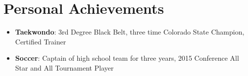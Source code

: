 \documentclass[10pt,letterpaper]{article}
\begin{document}
\section*{Personal Achievements}
\begin{itemize}
    \item \textbf{Taekwondo}: 3rd Degree Black Belt, three time Colorado State
        Champion, Certified Trainer
    \item \textbf{Soccer}: Captain of high school team for three years, 2015
        Conference All Star and All Tournament Player
\end{itemize}


\end{document}
